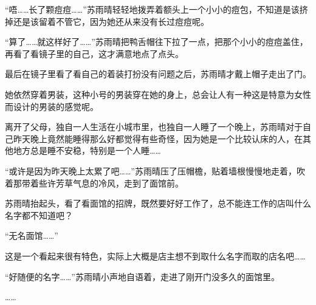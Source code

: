 “唔……长了颗痘痘……”苏雨晴轻轻地拨弄着额头上一个小小的痘包，不知道是该挤掉还是该留着不管它，因为她还从来没有长过痘痘呢。

“算了……就这样好了……”苏雨晴把鸭舌帽往下拉了一点，把那个小小的痘痘盖住，再看了看镜子里的自己，这才满意地点了点头。

最后在镜子里看了看自己的着装打扮没有问题之后，苏雨晴才戴上帽子走出了门。

她依然穿着男装，这种小号的男装穿在她的身上，总会让人有一种这是特意为女性而设计的男装的感觉呢。

离开了父母，独自一人生活在小城市里，也独自一人睡了一个晚上，苏雨晴对于自己昨天晚上竟然能睡得那么好都觉得有些奇怪，因为她是一个比较认床的人，在其他地方总是睡不安稳，特别是一个人睡……

“或许是因为昨天晚上太累了吧……”苏雨晴压了压帽檐，贴着墙根慢慢地走着，吹着那带着些许芳草气息的冷风，走到了面馆前。

苏雨晴抬起头，看了看面馆的招牌，既然要好好工作了，总不能连工作的店叫什么名字都不知道吧？

“无名面馆……”

这是一个看起来很有特色，实际上大概是店主想不到取什么名字而取的店名吧……

“好随便的名字……”苏雨晴小声地自语着，走进了刚开门没多久的面馆里。

……
